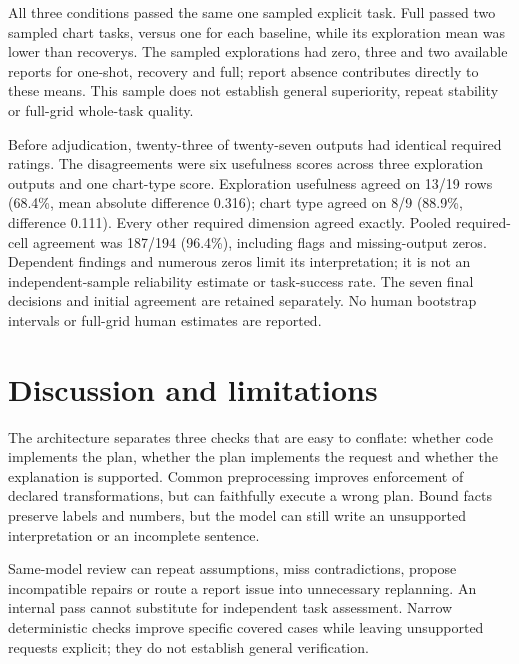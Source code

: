 All three conditions passed the same one sampled explicit task. Full passed two sampled chart tasks, versus one for each baseline, while its exploration mean was lower than recovery\textquotesingle s. The sampled explorations had zero, three and two available reports for one-shot, recovery and full; report absence contributes directly to these means. This sample does not establish general superiority, repeat stability or full-grid whole-task quality.

Before adjudication, twenty-three of twenty-seven outputs had identical required ratings. The disagreements were six usefulness scores across three exploration outputs and one chart-type score. Exploration usefulness agreed on 13/19 rows (68.4\%, mean absolute difference 0.316); chart type agreed on 8/9 (88.9\%, difference 0.111). Every other required dimension agreed exactly. Pooled required-cell agreement was 187/194 (96.4\%), including flags and missing-output zeros. Dependent findings and numerous zeros limit its interpretation; it is not an independent-sample reliability estimate or task-success rate. The seven final decisions and initial agreement are retained separately. No human bootstrap intervals or full-grid human estimates are reported.

\section{Discussion and limitations}\label{discussion-and-limitations}

The architecture separates three checks that are easy to conflate: whether code implements the plan, whether the plan implements the request and whether the explanation is supported. Common preprocessing improves enforcement of declared transformations, but can faithfully execute a wrong plan. Bound facts preserve labels and numbers, but the model can still write an unsupported interpretation or an incomplete sentence.

Same-model review can repeat assumptions, miss contradictions, propose incompatible repairs or route a report issue into unnecessary replanning. An internal pass cannot substitute for independent task assessment. Narrow deterministic checks improve specific covered cases while leaving unsupported requests explicit; they do not establish general verification.

